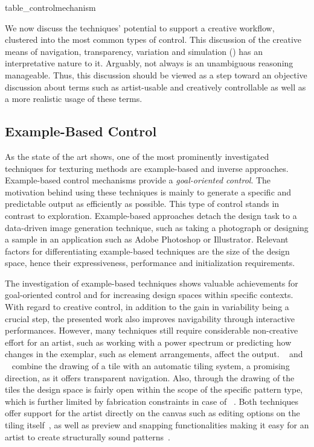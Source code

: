 {table_controlmechanism}

We now discuss the techniques' potential to support a creative workflow, clustered into the most common types of control. This discussion of the creative means of navigation, transparency, variation and simulation () has an interpretative nature to it. Arguably, not always is an unambiguous reasoning manageable. Thus, this discussion should be viewed as a step toward an objective discussion about terms such as artist-usable and creatively controllable as well as a more realistic usage of these terms.

\subsection{Example-Based Control}
\label{subsubsec:analysis_creative_means_example}

As the state of the art shows, one of the most prominently investigated techniques for texturing methods are example-based and inverse approaches. Example-based control mechanisms provide a \textit{goal-oriented control}. The motivation behind using these techniques is mainly to generate a specific and predictable output as efficiently as possible. This type of control stands in contrast to exploration. Example-based approaches detach the design task to a data-driven image generation technique, such as taking a photograph or designing a sample in an application such as Adobe Photoshop or Illustrator. Relevant factors for differentiating example-based techniques are the size of the design space, hence their expressiveness, performance and initialization requirements. 

The investigation of example-based techniques shows valuable achievements for goal-oriented control and for increasing design spaces within specific contexts. With regard to creative control, in addition to the gain in variability being a crucial step, the presented work also improves navigability through interactive performances. However, many techniques still require considerable non-creative effort for an artist, such as working with a power spectrum or predicting how changes in the exemplar, such as element arrangements, affect the output. \citeauthor*{tu_2020_cct}~\cite{tu_2020_cct} and \citeauthor*{bian_2018_tpd}~\cite{bian_2018_tpd} combine the drawing of a tile with an automatic tiling system, a promising direction, as it offers transparent navigation. Also, through the drawing of the tiles the design space is fairly open within the scope of the specific pattern type, which is further limited by fabrication constraints in case of \citeauthor*{bian_2018_tpd}~\cite{bian_2018_tpd}. Both techniques offer support for the artist directly on the canvas such as editing options on the tiling itself~\cite{tu_2020_cct}, as well as preview and snapping functionalities making it easy for an artist to create structurally sound patterns~\cite{bian_2018_tpd}. 

